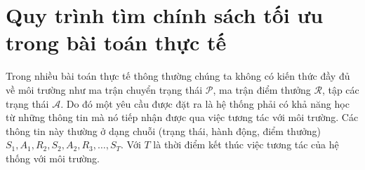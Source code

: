 \section{Quy trình tìm chính sách tối ưu trong bài toán thực tế}
Trong nhiều bài toán thực tế thông thường chúng ta không có kiến thức đầy đủ về môi trường như ma trận chuyển trạng thái $\mathcal{P}$, ma trận điểm thưởng $\mathcal{R}$, tập các trạng thái $\mathcal{A}$. Do đó một yêu cầu được đặt ra là hệ thống phải có khả năng học từ những thông tin mà nó tiếp nhận được qua việc tương tác với môi trường. Các thông tin này thường ở dạng chuỗi (trạng thái, hành động, điểm thưởng)
$\mathit{S}_1, \mathit{A}_1, \mathit{R}_2, \mathit{S}_2, \mathit{A}_2, \mathit{R}_3, \dots, \mathit{S}_T$. Với $T$ là thời điểm kết thúc việc tương tác của hệ thống với môi trường.

